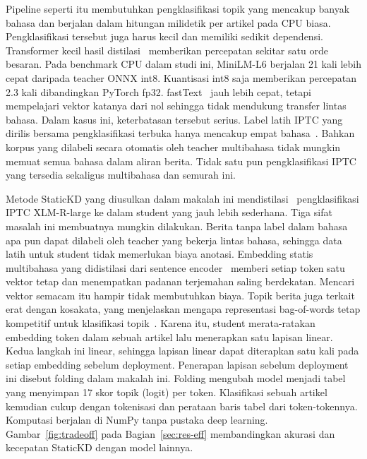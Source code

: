 \documentclass[journal]{IEEEtran}
\begin{document}
Pipeline seperti itu membutuhkan pengklasifikasi topik yang mencakup banyak bahasa dan berjalan dalam hitungan milidetik per artikel pada CPU biasa. Pengklasifikasi tersebut juga harus kecil dan memiliki sedikit dependensi. Transformer kecil hasil distilasi~\cite{sanh2019distilbert,wang2021minilmv2} memberikan percepatan sekitar satu orde besaran. Pada benchmark CPU dalam studi ini, MiniLM-L6 berjalan 21 kali lebih cepat daripada teacher ONNX int8. Kuantisasi int8 saja memberikan percepatan 2.3 kali dibandingkan PyTorch fp32. fastText~\cite{joulin2017bag} jauh lebih cepat, tetapi mempelajari vektor katanya dari nol sehingga tidak mendukung transfer lintas bahasa. Dalam kasus ini, keterbatasan tersebut serius. Label latih IPTC yang dirilis bersama pengklasifikasi terbuka hanya mencakup empat bahasa~\cite{emmediatopic2025}. Bahkan korpus yang dilabeli secara otomatis oleh teacher multibahasa tidak mungkin memuat semua bahasa dalam aliran berita. Tidak satu pun pengklasifikasi IPTC yang tersedia sekaligus multibahasa dan semurah ini.

Metode StaticKD yang diusulkan dalam makalah ini mendistilasi~\cite{hinton2015distilling} pengklasifikasi IPTC XLM-R-large ke dalam student yang jauh lebih sederhana. Tiga sifat masalah ini membuatnya mungkin dilakukan. Berita tanpa label dalam bahasa apa pun dapat dilabeli oleh teacher yang bekerja lintas bahasa, sehingga data latih untuk student tidak memerlukan biaya anotasi. Embedding statis multibahasa yang didistilasi dari sentence encoder~\cite{tulkens2024model2vec,wada2025static,chen2024bgem3} memberi setiap token satu vektor tetap dan menempatkan padanan terjemahan saling berdekatan. Mencari vektor semacam itu hampir tidak membutuhkan biaya. Topik berita juga terkait erat dengan kosakata, yang menjelaskan mengapa representasi bag-of-words tetap kompetitif untuk klasifikasi topik~\cite{galke2022bow}. Karena itu, student merata-ratakan embedding token dalam sebuah artikel lalu menerapkan satu lapisan linear. Kedua langkah ini linear, sehingga lapisan linear dapat diterapkan satu kali pada setiap embedding sebelum deployment. Penerapan lapisan sebelum deployment ini disebut folding dalam makalah ini. Folding mengubah model menjadi tabel yang menyimpan 17 skor topik (logit) per token. Klasifikasi sebuah artikel kemudian cukup dengan tokenisasi dan perataan baris tabel dari token-tokennya. Komputasi berjalan di NumPy tanpa pustaka deep learning. Gambar~\ref{fig:tradeoff} pada Bagian~\ref{sec:res-eff} membandingkan akurasi dan kecepatan StaticKD dengan model lainnya.
\end{document}
